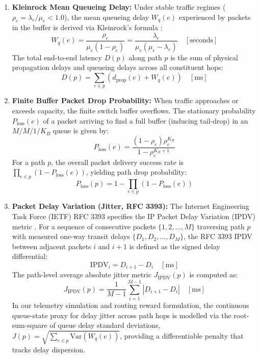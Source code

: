 \documentclass[12pt,a4paper,oneside]{report}
\begin{document}
\begin{enumerate}
    \item \textbf{Kleinrock Mean Queueing Delay:}
    Under stable traffic regimes ($\rho_e = \lambda_e / \mu_e < 1.0$), the mean queueing delay $W_{q}(e)$ experienced by packets in the buffer is derived via Kleinrock's formula \cite{kleinrock1964communication}:
    \begin{equation}
    W_{q}(e) = \frac{\rho_e}{\mu_e(1 - \rho_e)} = \frac{\lambda_e}{\mu_e(\mu_e - \lambda_e)} \quad [\text{seconds}]
    \end{equation}
    The total end-to-end latency $D(p)$ along path $p$ is the sum of physical propagation delays and queueing delays across all constituent hops:
    \begin{equation}
    D(p) = \sum_{e \in p} \left( d_{\text{prop}}(e) + W_{q}(e) \right) \quad [\text{ms}]
    \end{equation}

    \item \textbf{Finite Buffer Packet Drop Probability:}
    When traffic approaches or exceeds capacity, the finite switch buffer overflows. The stationary probability $P_{\text{loss}}(e)$ of a packet arriving to find a full buffer (inducing tail-drop) in an $M/M/1/K_B$ queue is given by:
    \begin{equation}
    P_{\text{loss}}(e) = \frac{(1 - \rho_e)\rho_e^{K_B}}{1 - \rho_e^{K_B + 1}}
    \end{equation}
    For a path $p$, the overall packet delivery success rate is $\prod_{e \in p} (1 - P_{\text{loss}}(e))$, yielding path drop probability:
    \begin{equation}
    P_{\text{loss}}(p) = 1 - \prod_{e \in p} \left(1 - P_{\text{loss}}(e)\right)
    \end{equation}

    \item \textbf{Packet Delay Variation (Jitter, RFC 3393):}
    The Internet Engineering Task Force (IETF) RFC 3393 specifies the IP Packet Delay Variation (IPDV) metric \cite{rfc3393}. For a sequence of consecutive packets $\{1, 2, \dots, M\}$ traversing path $p$ with measured one-way transit delays $\{D_1, D_2, \dots, D_M\}$, the RFC 3393 IPDV between adjacent packets $i$ and $i+1$ is defined as the signed delay differential:
    \begin{equation}
    \text{IPDV}_i = D_{i+1} - D_i \quad [\text{ms}]
    \end{equation}
    The path-level average absolute jitter metric $J_{\text{IPDV}}(p)$ is computed as:
    \begin{equation}
    J_{\text{IPDV}}(p) = \frac{1}{M - 1} \sum_{i=1}^{M-1} \left| D_{i+1} - D_i \right| \quad [\text{ms}]
    \end{equation}
    In our telemetry simulation and routing reward formulation, the continuous queue-state proxy for delay jitter across path hops is modelled via the root-sum-square of queue delay standard deviations, $J(p) = \sqrt{\sum_{e \in p} \text{Var}(W_q(e))}$, providing a differentiable penalty that tracks delay dispersion.
\end{enumerate}
\end{document}
